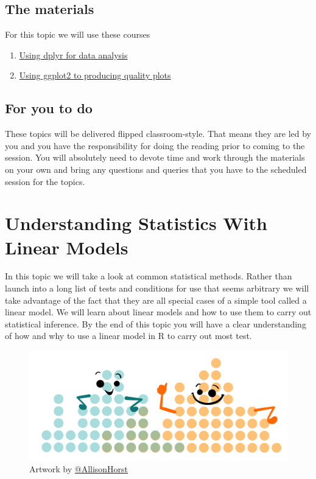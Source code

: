\documentclass[
]{book}
\providecommand{\tightlist}{%
  \setlength{\itemsep}{0pt}\setlength{\parskip}{0pt}}
\begin{document}
\hypertarget{the-materials-1}{%
\section{The materials}\label{the-materials-1}}

For this topic we will use these courses

\begin{enumerate}
\def\labelenumi{\arabic{enumi}.}
\tightlist
\item
  \href{https://danmaclean.github.io/tidyversebook/index.html}{Using dplyr for data analysis}
\item
  \href{https://danmaclean.github.io/ggplotbook/index.html}{Using ggplot2 to producing quality plots}
\end{enumerate}

\hypertarget{for-you-to-do-1}{%
\section{For you to do}\label{for-you-to-do-1}}

These topics will be delivered flipped classroom-style. That means they are led by you and you have the responsibility for doing the reading prior to coming to the session. You will absolutely need to devote time and work through the materials on your own and bring any questions and queries that you have to the scheduled session for the topics.

\hypertarget{understanding-statistics-with-linear-models}{%
\chapter{Understanding Statistics With Linear Models}\label{understanding-statistics-with-linear-models}}

In this topic we will take a look at common statistical methods. Rather than launch into a long list of tests and conditions for use that seems arbitrary we will take advantage of the fact that they are all special cases of a simple tool called a linear model. We will learn about linear models and how to use them to carry out statistical inference. By the end of this topic you will have a clear understanding of how and why to use a linear model in R to carry out most test.

\begin{figure}
\centering
\includegraphics{ex_4.png}
\caption{\label{fig:unnamed-chunk-4}Artwork by \href{https://github.com/allisonhorst}{@AllisonHorst}}
\end{figure}
\end{document}
